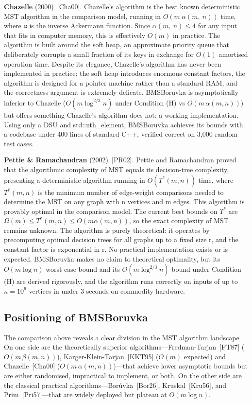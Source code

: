 \documentclass[11pt]{article}
\theoremstyle{plain}
\theoremstyle{remark}
\begin{document}
\textbf{Chazelle} (2000)~{[}Cha00{]}. Chazelle's algorithm is the best
known deterministic MST algorithm in the comparison model, running in
\(O(m\ \alpha(m,\ n))\) time, where α is the inverse Ackermann function.
Since \(\alpha(m,\ n) \leq 4\) for any input that fits in computer
memory, this is effectively \(O(m)\) in practice. The algorithm is built
around the soft heap, an approximate priority queue that deliberately
corrupts a small fraction of its keys in exchange for \(O(1)\) amortised
operation time. Despite its elegance, Chazelle's algorithm has never
been implemented in practice: the soft heap introduces enormous constant
factors, the algorithm is designed for a pointer machine rather than a
standard RAM, and the correctness argument is extremely delicate.
BMSBoruvka is asymptotically inferior to Chazelle
(\(O(m \log^{2/3} n)\) under Condition (H) vs \(O(m\,\alpha(m,n))\))
but offers something Chazelle's algorithm does not: a working
implementation. Using only a DSU and std::nth\_element, BMSBoruvka
achieves its bounds with a codebase under 400 lines of standard C++,
verified correct on 3,000 random test cases.

\textbf{Pettie \& Ramachandran} (2002)~{[}PR02{]}. Pettie and
Ramachandran proved that the algorithmic complexity of MST equals its
decision-tree complexity, presenting a deterministic algorithm running
in \(O\left( T^{*}(m,n) \right)\) time, where \(T^{*}(m,n)\) is the
minimum number of edge-weight comparisons needed to determine the MST on
any graph with n vertices and m edges. This algorithm is provably
optimal in the comparison model. The current best bounds on \(T^{*}\)
are \(\Omega(m) \leq T^{*}(m,n) \leq O\left( m\alpha(m,n) \right)\), so
the exact complexity of MST remains unknown. The algorithm is purely
theoretical: it operates by precomputing optimal decision trees for all
graphs up to a fixed size r, and the constant factor is exponential in
r. No practical implementation exists or is expected. BMSBoruvka makes
no claim to theoretical optimality, but its \(O(m \log n)\)
worst-case bound and its \(O(m \log^{2/3} n)\) bound under Condition
(H) are derived rigorously, and the algorithm runs correctly on inputs
of up to
\(n = 10^{6}\) vertices in under 3 seconds on commodity hardware.

\subsection{Positioning of BMSBoruvka}

The comparison above reveals a clear division in the MST algorithm
landscape. On one side are the theoretically superior
algorithms---Fredman-Tarjan~{[}FT87{]} (\(O(m\,\beta(m,n))\)),
Karger-Klein-Tarjan~{[}KKT95{]} (\(O(m)\) expected) and
Chazelle~{[}Cha00{]} (\(O(m\,\alpha(m,n))\))---that achieve lower
asymptotic bounds but are either randomised, impractical to implement,
or both. On the other side are the classical practical
algorithms---Borůvka~{[}Bor26{]}, Kruskal~{[}Kru56{]}, and
Prim~{[}Pri57{]}---that are widely deployed but plateau at
\(O(m \log n)\).
\end{document}
